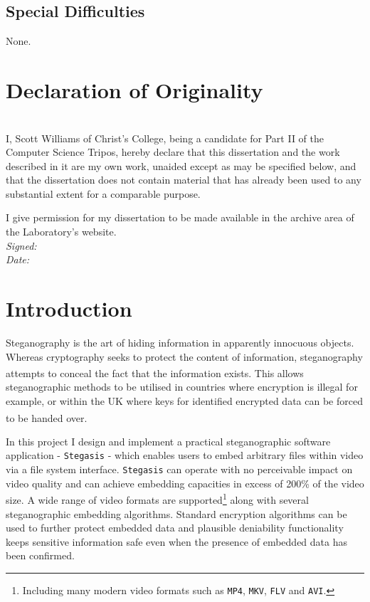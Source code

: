 \documentclass[paper=a4, fontsize=11pt,twoside]{scrartcl}
\numberwithin{table}{section}
\numberwithin{figure}{section}
\numberwithin{algorithm}{section}
\begin{document}
\subsection*{Special Difficulties}
None.

\pagebreak
\section*{Declaration of Originality}
~\\[5pt]
I, Scott Williams of Christ's College, being a candidate for Part II of the Computer
Science Tripos, hereby declare that this dissertation and the work described
in it are my own work, unaided except as may be specified below, and that
the dissertation does not contain material that has already been used to any
substantial extent for a comparable purpose.

I give permission for my dissertation to be made available in the archive
area of the Laboratory's website.\\[20pt]
\textit{Signed:}\\[20pt]
\textit{Date:}
\clearpage

\tableofcontents
\vfill

\pagebreak
{} 
\section{Introduction}
Steganography is the art of hiding information in apparently innocuous objects. Whereas cryptography seeks to protect the content of information, steganography attempts to conceal the fact that the information exists\textsuperscript{\cite{digmedia}}. This allows steganographic methods to be utilised in countries where encryption is illegal for example, or within the UK where keys for identified encrypted data can be forced to be handed over\textsuperscript{\cite{uklaw}}.

In this project I design and implement a practical steganographic software application - \texttt{Stegasis} - which enables users to embed arbitrary files within video via a file system interface. \texttt{Stegasis} can operate with no perceivable impact on video quality and can achieve embedding capacities in excess of 200\% of the video size. A wide range of video formats are supported\footnote{Including many modern video formats such as \texttt{MP4}, \texttt{MKV}, \texttt{FLV} and \texttt{AVI}.} along with several steganographic embedding algorithms. Standard encryption algorithms can be used to further protect embedded data and plausible deniability functionality keeps sensitive information safe even when the presence of embedded data has been confirmed.
\end{document}
